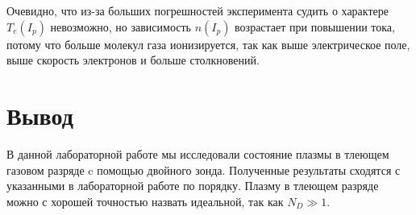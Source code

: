 \documentclass[a4paper, 10pt]{article}
\begin{document}
        Очевидно, что из-за больших погрешностей эксперимента судить о характере $T_e(I_p)$ невозможно,
        но зависимость $n(I_p)$ возрастает при повышении тока, потому что больше молекул газа ионизируется, так как выше электрическое поле, выше скорость электронов и больше столкновений.


        \newpage
        \section*{Вывод}
        В данной лабораторной работе мы исследовали состояние плазмы в тлеющем газовом разряде c помощью двойного зонда. Полученные результаты сходятся с указанными в лабораторной работе по порядку. Плазму в тлеющем разряде можно с хорошей точностью назвать идеальной, так как $N_D \gg 1$.
\end{document}
